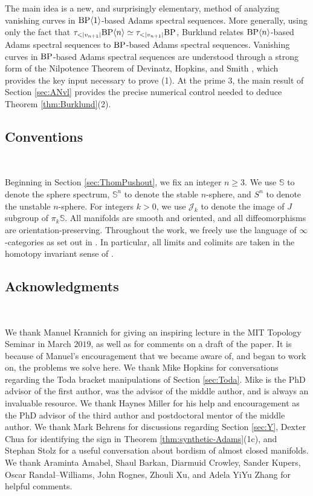 The main idea is a new, and surprisingly elementary, method of analyzing vanishing curves in $\mathrm{BP} \langle 1 \rangle$-based Adams spectral sequences.  More generally, using only the fact that $\tau_{<|v_{n+1}|} \BP \langle n \rangle \simeq \tau_{<|v_{n+1}|} \BP$, Burklund relates $\mathrm{BP} \langle n \rangle$-based Adams spectral sequences to $\mathrm{BP}$-based Adams spectral sequences.
Vanishing curves in $\mathrm{BP}$-based Adams spectral sequences are understood through a strong form of the Nilpotence Theorem of Devinatz, Hopkins, and Smith \cite{DHS}, which provides the key input necessary to prove (1). At the prime $3$, the main result of Section \ref{sec:ANvl} provides the precise numerical control needed to deduce Theorem \ref{thm:Burklund}(2).

\subsection{Conventions}\

Beginning in Section \ref{sec:ThomPushout}, we fix an integer $n \ge 3$.  We use $\mathbb{S}$ to denote the sphere spectrum, $\mathbb{S}^n$ to denote the stable $n$-sphere, and $S^{n}$ to denote the unstable $n$-sphere.  For integers $k>0$, we use $\mathcal{J}_{k}$ to denote the image of $J$ subgroup of $\pi_{k} \mathbb{S}$.  All manifolds are smooth and oriented, and all diffeomorphisms are orientation-preserving.  Throughout the work, we freely use the language of $\infty$-categories as set out in \cite{HA,HTT}. In particular, all limits and colimits are taken in the homotopy invariant sense of \cite{HTT}.

\subsection{Acknowledgments}\

We thank Manuel Krannich for giving an inspiring lecture in the MIT Topology Seminar in March $2019$, as well as for comments on a draft of the paper.  It is because of Manuel's encouragement that we became aware of, and began to work on, the problems we solve here.
We thank Mike Hopkins for conversations regarding the Toda bracket manipulations of Section \ref{sec:Toda}. 
Mike is the PhD advisor of the first author, was the advisor of the middle author, and is always an invaluable resource.
We thank Haynes Miller for his help and encouragement as the PhD advisor of the third author and postdoctoral mentor of the middle author.
We thank Mark Behrens for discussions regarding Section \ref{sec:Y}, Dexter Chua for identifying the sign in Theorem \ref{thm:synthetic-Adams}(1c), and Stephan Stolz for a useful conversation about bordism of almost closed manifolds.
We thank Araminta Amabel, Shaul Barkan, Diarmuid Crowley, Sander Kupers, Oscar Randal--Williams, John Rognes, Zhouli Xu, and Adela YiYu Zhang for helpful comments.

